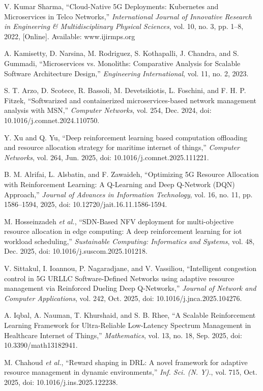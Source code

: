 \cite{b10} V. Kumar Sharma, ``Cloud-Native 5G Deployments: Kubernetes and Microservices in Telco Networks,'' \emph{International Journal of Innovative Research in Engineering \& Multidisciplinary Physical Sciences}, vol. 10, no. 3, pp. 1--8, 2022, {[}Online{]}. Available: www.ijirmps.org

\cite{b11} A. Kamisetty, D. Narsina, M. Rodriguez, S. Kothapalli, J. Chandra, and S. Gummadi, ``Microservices vs. Monoliths: Comparative Analysis for Scalable Software Architecture Design,'' \emph{Engineering International}, vol. 11, no. 2, 2023.

\cite{b12} S. T. Arzo, D. Scotece, R. Bassoli, M. Devetsikiotis, L. Foschini, and F. H. P. Fitzek, ``Softwarized and containerized microservices-based network management analysis with MSN,'' \emph{Computer Networks}, vol. 254, Dec. 2024, doi: 10.1016/j.comnet.2024.110750.

\cite{b13} Y. Xu and Q. Yu, ``Deep reinforcement learning based computation offloading and resource allocation strategy for maritime internet of things,'' \emph{Computer Networks}, vol. 264, Jun. 2025, doi: 10.1016/j.comnet.2025.111221.

\cite{b14} B. M. Alrifai, L. Alsbatin, and F. Zawaideh, ``Optimizing 5G Resource Allocation with Reinforcement Learning: A Q-Learning and Deep Q-Network (DQN) Approach,'' \emph{Journal of Advances in Information Technology}, vol. 16, no. 11, pp. 1586--1594, 2025, doi: 10.12720/jait.16.11.1586-1594.

\cite{b15} M. Hosseinzadeh \emph{et al.}, ``SDN-Based NFV deployment for multi-objective resource allocation in edge computing: A deep reinforcement learning for iot workload scheduling,'' \emph{Sustainable Computing: Informatics and Systems}, vol. 48, Dec. 2025, doi: 10.1016/j.suscom.2025.101218.

\cite{b16} V. Sittakul, I. Ioannou, P. Nagaradjane, and V. Vassiliou, ``Intelligent congestion control in 5G URLLC Software-Defined Networks using adaptive resource management via Reinforced Dueling Deep Q-Networks,'' \emph{Journal of Network and Computer Applications}, vol. 242, Oct. 2025, doi: 10.1016/j.jnca.2025.104276.

\cite{b17} A. Iqbal, A. Nauman, T. Khurshaid, and S. B. Rhee, ``A Scalable Reinforcement Learning Framework for Ultra-Reliable Low-Latency Spectrum Management in Healthcare Internet of Things,'' \emph{Mathematics}, vol. 13, no. 18, Sep. 2025, doi: 10.3390/math13182941.

\cite{b18} M. Chahoud \emph{et al.}, ``Reward shaping in DRL: A novel framework for adaptive resource management in dynamic environments,'' \emph{Inf. Sci. (N. Y).}, vol. 715, Oct. 2025, doi: 10.1016/j.ins.2025.122238.

